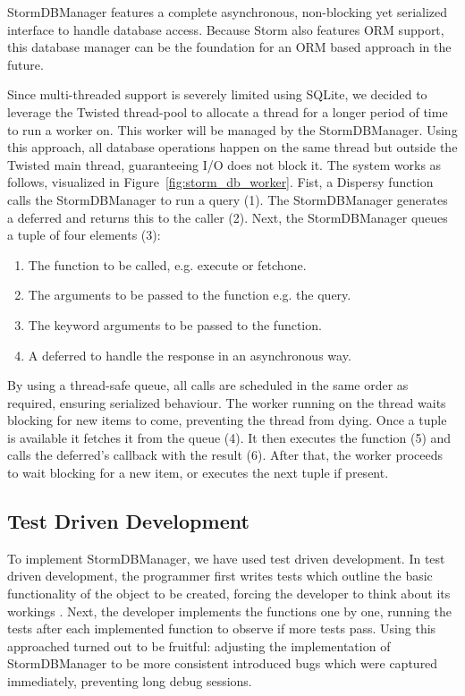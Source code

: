 StormDBManager features a complete asynchronous, non-blocking yet serialized interface to handle database access.
Because Storm also features ORM support, this database manager can be the foundation for an ORM based approach in the future.

Since multi-threaded support is severely limited using SQLite, we decided to leverage the Twisted thread-pool to allocate a thread for a longer period of time to run a worker on.
This worker will be managed by the StormDBManager.
Using this approach, all database operations happen on the same thread but outside the Twisted main thread, guaranteeing I/O does not block it.
The system works as follows, visualized in Figure~\ref{fig:storm_db_worker}.
Fist, a Dispersy function calls the StormDBManager to run a query (1).
The StormDBManager generates a deferred and returns this to the caller (2).
Next, the StormDBManager queues a tuple of four elements (3):

\begin{enumerate}
	\item The function to be called, e.g. execute or fetchone.
	\item The arguments to be passed to the function e.g. the query.
	\item The keyword arguments to be passed to the function.
	\item A deferred to handle the response in an asynchronous way.
\end{enumerate}

By using a thread-safe queue, all calls are scheduled in the same order as required, ensuring serialized behaviour.
The worker running on the thread waits blocking for new items to come, preventing the thread from dying.
Once a tuple is available it fetches it from the queue (4).
It then executes the function (5) and calls the deferred's callback with the result (6).
After that, the worker proceeds to wait blocking for a new item, or executes the next tuple if present.

\subsection{Test Driven Development}
To implement StormDBManager, we have used test driven development.
In test driven development, the programmer first writes tests which outline the basic functionality of the object to be created, forcing the developer to think about its workings \cite{janzen2005test}.
Next, the developer implements the functions one by one, running the tests after each implemented function to observe if more tests pass.
Using this approached turned out to be fruitful: adjusting the implementation of StormDBManager to be more consistent introduced bugs which were captured immediately, preventing long debug sessions.

